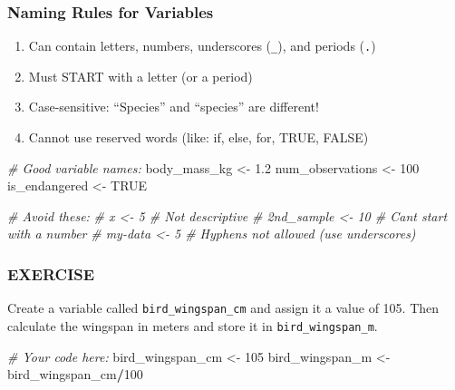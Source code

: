 \documentclass[
]{article}
\newenvironment{Shaded}{\begin{snugshade}}{\end{snugshade}}
\newcommand{\CommentTok}[1]{\textcolor[rgb]{0.56,0.35,0.01}{\textit{#1}}}
\newcommand{\ConstantTok}[1]{\textcolor[rgb]{0.56,0.35,0.01}{#1}}
\newcommand{\DecValTok}[1]{\textcolor[rgb]{0.00,0.00,0.81}{#1}}
\newcommand{\FloatTok}[1]{\textcolor[rgb]{0.00,0.00,0.81}{#1}}
\newcommand{\NormalTok}[1]{#1}
\newcommand{\OtherTok}[1]{\textcolor[rgb]{0.56,0.35,0.01}{#1}}
\newcommand{\SpecialCharTok}[1]{\textcolor[rgb]{0.81,0.36,0.00}{\textbf{#1}}}
\providecommand{\tightlist}{%
  \setlength{\itemsep}{0pt}\setlength{\parskip}{0pt}}
\begin{document}
\subsubsection{Naming Rules for
Variables}\label{naming-rules-for-variables}

\begin{enumerate}
\def\labelenumi{\arabic{enumi}.}
\tightlist
\item
  Can contain letters, numbers, underscores (\texttt{\_}), and periods
  (\texttt{.})
\item
  Must START with a letter (or a period)
\item
  Case-sensitive: ``Species'' and ``species'' are different!
\item
  Cannot use reserved words (like: if, else, for, TRUE, FALSE)
\end{enumerate}

\begin{Shaded}
\begin{Highlighting}[]
\CommentTok{\# Good variable names:}
\NormalTok{body\_mass\_kg }\OtherTok{\textless{}{-}} \FloatTok{1.2}
\NormalTok{num\_observations }\OtherTok{\textless{}{-}} \DecValTok{100}
\NormalTok{is\_endangered }\OtherTok{\textless{}{-}} \ConstantTok{TRUE}

\CommentTok{\# Avoid these:}
\CommentTok{\# x \textless{}{-} 5           \# Not descriptive}
\CommentTok{\# 2nd\_sample \textless{}{-} 10 \# Can\textquotesingle{}t start with a number}
\CommentTok{\# my{-}data \textless{}{-} 5     \# Hyphens not allowed (use underscores)}
\end{Highlighting}
\end{Shaded}

\subsubsection{EXERCISE}\label{exercise}

Create a variable called \texttt{bird\_wingspan\_cm} and assign it a
value of 105. Then calculate the wingspan in meters and store it in
\texttt{bird\_wingspan\_m}.

\begin{Shaded}
\begin{Highlighting}[]
\CommentTok{\# Your code here:}
\NormalTok{bird\_wingspan\_cm }\OtherTok{\textless{}{-}} \DecValTok{105}
\NormalTok{bird\_wingspan\_m }\OtherTok{\textless{}{-}}\NormalTok{ bird\_wingspan\_cm}\SpecialCharTok{/}\DecValTok{100}
\end{Highlighting}
\end{Shaded}
\end{document}
